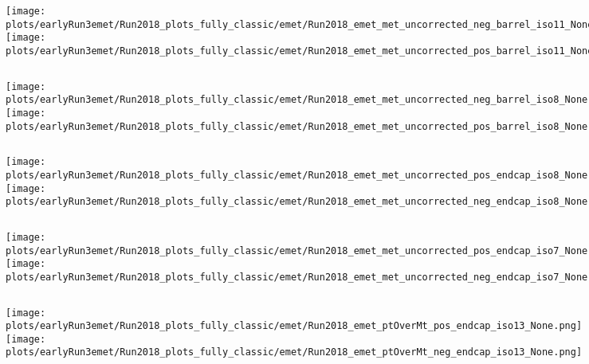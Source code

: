 \documentclass[en,16:9,navbarinfooter]{presentation/sdqbeamer}
\begin{document}
\begin{frame}{\insertsubsection}
   \begin{columns}
   \texttt{[image: plots/earlyRun3emet/Run2018\_plots\_fully\_classic/emet/Run2018\_emet\_met\_uncorrected\_neg\_barrel\_iso11\_None.png]}
   \texttt{[image: plots/earlyRun3emet/Run2018\_plots\_fully\_classic/emet/Run2018\_emet\_met\_uncorrected\_pos\_barrel\_iso11\_None.png]}
\end{columns}
\end{frame}

\begin{frame}{\insertsubsection}
   \begin{columns}
   \texttt{[image: plots/earlyRun3emet/Run2018\_plots\_fully\_classic/emet/Run2018\_emet\_met\_uncorrected\_neg\_barrel\_iso8\_None.png]}
   \texttt{[image: plots/earlyRun3emet/Run2018\_plots\_fully\_classic/emet/Run2018\_emet\_met\_uncorrected\_pos\_barrel\_iso8\_None.png]}
\end{columns}
\end{frame}

\begin{frame}{\insertsubsection}
   \begin{columns}
   \texttt{[image: plots/earlyRun3emet/Run2018\_plots\_fully\_classic/emet/Run2018\_emet\_met\_uncorrected\_pos\_endcap\_iso8\_None.png]}
   \texttt{[image: plots/earlyRun3emet/Run2018\_plots\_fully\_classic/emet/Run2018\_emet\_met\_uncorrected\_neg\_endcap\_iso8\_None.png]}
\end{columns}
\end{frame}

\begin{frame}{\insertsubsection}
   \begin{columns}
   \texttt{[image: plots/earlyRun3emet/Run2018\_plots\_fully\_classic/emet/Run2018\_emet\_met\_uncorrected\_pos\_endcap\_iso7\_None.png]}
   \texttt{[image: plots/earlyRun3emet/Run2018\_plots\_fully\_classic/emet/Run2018\_emet\_met\_uncorrected\_neg\_endcap\_iso7\_None.png]}
\end{columns}
\end{frame}

\begin{frame}{\insertsubsection}
   \begin{columns}
   \texttt{[image: plots/earlyRun3emet/Run2018\_plots\_fully\_classic/emet/Run2018\_emet\_ptOverMt\_pos\_endcap\_iso13\_None.png]}
   \texttt{[image: plots/earlyRun3emet/Run2018\_plots\_fully\_classic/emet/Run2018\_emet\_ptOverMt\_neg\_endcap\_iso13\_None.png]}
\end{columns}
\end{frame}
\end{document}
